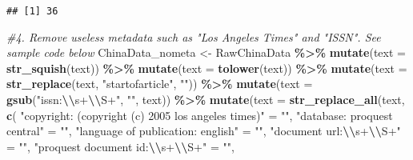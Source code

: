 \documentclass[
]{article}
\newenvironment{Shaded}{\begin{snugshade}}{\end{snugshade}}
\newcommand{\AttributeTok}[1]{\textcolor[rgb]{0.13,0.29,0.53}{#1}}
\newcommand{\CommentTok}[1]{\textcolor[rgb]{0.56,0.35,0.01}{\textit{#1}}}
\newcommand{\FunctionTok}[1]{\textcolor[rgb]{0.13,0.29,0.53}{\textbf{#1}}}
\newcommand{\NormalTok}[1]{#1}
\newcommand{\OtherTok}[1]{\textcolor[rgb]{0.56,0.35,0.01}{#1}}
\newcommand{\SpecialCharTok}[1]{\textcolor[rgb]{0.81,0.36,0.00}{\textbf{#1}}}
\newcommand{\StringTok}[1]{\textcolor[rgb]{0.31,0.60,0.02}{#1}}
\begin{document}
\begin{Shaded}
\end{Shaded}

\begin{verbatim}
## [1] 36
\end{verbatim}

\begin{Shaded}
\begin{Highlighting}[]
\CommentTok{\#4. Remove useless metadata such as "Los Angeles Times" and "ISSN". See sample code below}
\NormalTok{ChinaData\_nometa }\OtherTok{\textless{}{-}}\NormalTok{ RawChinaData }\SpecialCharTok{\%\textgreater{}\%}
  \FunctionTok{mutate}\NormalTok{(}\AttributeTok{text =} \FunctionTok{str\_squish}\NormalTok{(text)) }\SpecialCharTok{\%\textgreater{}\%}
  \FunctionTok{mutate}\NormalTok{(}\AttributeTok{text =} \FunctionTok{tolower}\NormalTok{(text)) }\SpecialCharTok{\%\textgreater{}\%}
  \FunctionTok{mutate}\NormalTok{(}\AttributeTok{text =} \FunctionTok{str\_replace}\NormalTok{(text, }\StringTok{"startofarticle"}\NormalTok{, }\StringTok{""}\NormalTok{)) }\SpecialCharTok{\%\textgreater{}\%}
  \FunctionTok{mutate}\NormalTok{(}\AttributeTok{text =} \FunctionTok{gsub}\NormalTok{(}\StringTok{"issn:}\SpecialCharTok{\textbackslash{}\textbackslash{}}\StringTok{s+}\SpecialCharTok{\textbackslash{}\textbackslash{}}\StringTok{S+"}\NormalTok{, }\StringTok{""}\NormalTok{, text)) }\SpecialCharTok{\%\textgreater{}\%}
  \FunctionTok{mutate}\NormalTok{(}\AttributeTok{text =} \FunctionTok{str\_replace\_all}\NormalTok{(text, }\FunctionTok{c}\NormalTok{(}
    \StringTok{"copyright: (copyright (c) 2005 los angeles times)"} \OtherTok{=} \StringTok{""}\NormalTok{,}
    \StringTok{"database: proquest central"} \OtherTok{=} \StringTok{""}\NormalTok{,}
    \StringTok{"language of publication: english"} \OtherTok{=} \StringTok{""}\NormalTok{,}
    \StringTok{"document url:}\SpecialCharTok{\textbackslash{}\textbackslash{}}\StringTok{s+}\SpecialCharTok{\textbackslash{}\textbackslash{}}\StringTok{S+"} \OtherTok{=} \StringTok{""}\NormalTok{,}
    \StringTok{"proquest document id:}\SpecialCharTok{\textbackslash{}\textbackslash{}}\StringTok{s+}\SpecialCharTok{\textbackslash{}\textbackslash{}}\StringTok{S+"} \OtherTok{=} \StringTok{""}\NormalTok{,}

\end{Highlighting}
\end{Shaded}
\end{document}

